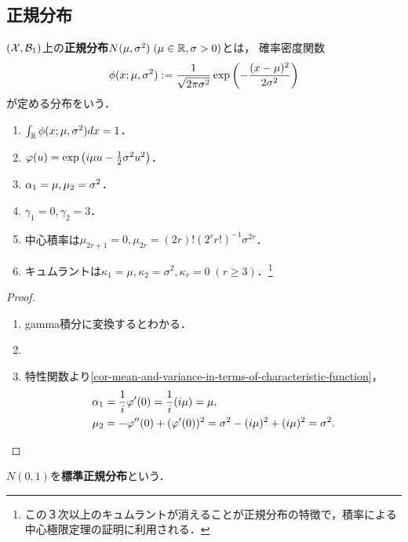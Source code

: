 \documentclass[uplatex,dvipdfmx]{jsreport}
\begin{document}
\subsection{正規分布}

\begin{definition}
    $(\mathcal{X},\mathcal{B}_1)$上の\textbf{正規分布}$N(\mu,\sigma^2)\;(\mu\in\mathbb{R},\sigma>0)$とは，
    確率密度関数
    \[\phi(x;\mu,\sigma^2):=\frac{1}{\sqrt{2\pi\sigma^2}}\exp\left(-\frac{(x-\mu)^2}{2\sigma^2}\right)\]
    が定める分布をいう．
\end{definition}

\begin{proposition}\mbox{}
    \begin{enumerate}
        \item $\int_{\mathbb{R}}\phi(x;\mu,\sigma^2)dx=1$．
        \item $\varphi(u)=\exp\left(i\mu u-\frac{1}{2}\sigma^2u^2\right)$．
        \item $\alpha_1=\mu,\mu_2=\sigma^2$．
        \item $\gamma_1=0,\gamma_2=3$．
        \item 中心積率は$\mu_{2r+1}=0,\mu_{2r}=(2r)!(2^rr!)^{-1}\sigma^{2r}$．
        \item キュムラントは$\kappa_1=\mu,\kappa_2=\sigma^2,\kappa_r=0\;(r\ge 3)$．\footnote{この３次以上のキュムラントが消えることが正規分布の特徴で，積率による中心極限定理の証明に利用される．}
    \end{enumerate}
\end{proposition}
\begin{proof}\mbox{}
    \begin{enumerate}
        \item gamma積分に変換するとわかる．
        \item 
        \item 特性関数より\ref{cor-mean-and-variance-in-terms-of-characteristic-function}，
        \begin{align*}
            \alpha_1&=\frac{1}{i}\varphi'(0)=\frac{1}{i}(i\mu)=\mu,\\
            \mu_2&=-\varphi''(0)+(\varphi'(0))^2=\sigma^2-(i\mu)^2+(i\mu)^2=\sigma^2.
        \end{align*}
    \end{enumerate}
\end{proof}

\begin{definition}
    $N(0,1)$を\textbf{標準正規分布}という．
\end{definition}
\end{document}
